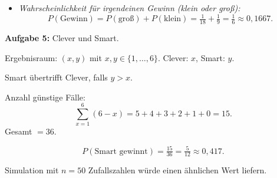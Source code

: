 \documentclass[11pt,a4paper,oneside]{article}
\begin{document}
\begin{loesung}
\begin{enumerate}
\begin{itemize}
				\item \emph{Wahrscheinlichkeit für irgendeinen Gewinn (klein oder groß):}  
				\[
				P(\text{Gewinn}) = P(\text{groß})+P(\text{klein})=\tfrac{1}{18}+\tfrac{1}{9}=\tfrac{1}{6}\approx 0{,}1667.
				\]
			\end{itemize}
			
		\end{enumerate}
		
		\vspace{1cm}
		
		\textbf{Aufgabe 5:} Clever und Smart.  
		
		Ergebnisraum: $(x,y)$ mit $x,y \in \{1,\dots,6\}$.  
		Clever: $x$, Smart: $y$.  
		
		Smart übertrifft Clever, falls $y>x$.  
		
		Anzahl günstige Fälle:  
		\[
		\sum_{x=1}^6 (6-x) = 5+4+3+2+1+0 = 15.
		\]  
		Gesamt $=36$.  
		
		\[
		P(\text{Smart gewinnt}) = \tfrac{15}{36} = \tfrac{5}{12} \approx 0{,}417.
		\]
		
		Simulation mit $n=50$ Zufallszahlen würde einen ähnlichen Wert liefern.  
		
	\end{loesung}
	
	
	\newpage
	
\end{document}
